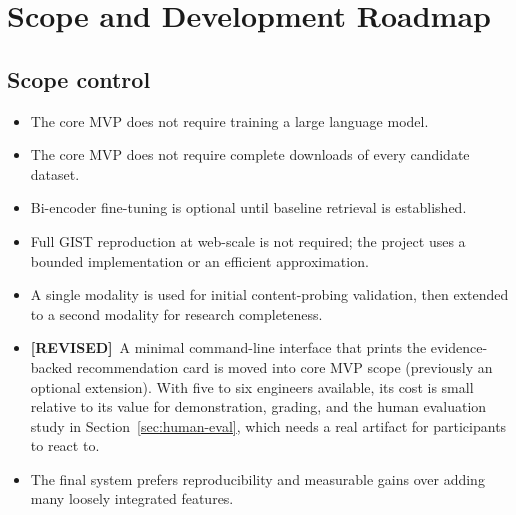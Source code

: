\documentclass[11pt]{article}
\newcommand{\revtag}{\textcolor{accent}{\textbf{[REVISED]}}\ }
\begin{document}
\section{Scope and Development Roadmap}

\subsection{Scope control}
\begin{itemize}[leftmargin=*]
\item The core MVP does not require training a large language model.
\item The core MVP does not require complete downloads of every candidate dataset.
\item Bi-encoder fine-tuning is optional until baseline retrieval is established.
\item Full GIST reproduction at web-scale is not required; the project uses a bounded implementation or an
      efficient approximation.
\item A single modality is used for initial content-probing validation, then extended to a second
      modality for research completeness.
\item \revtag A minimal command-line interface that prints the evidence-backed recommendation card is
      moved into core MVP scope (previously an optional extension). With five to six engineers available,
      its cost is small relative to its value for demonstration, grading, and the human evaluation study
      in Section~\ref{sec:human-eval}, which needs a real artifact for participants to react to.
\item The final system prefers reproducibility and measurable gains over adding many loosely integrated
      features.
\end{itemize}
\end{document}
